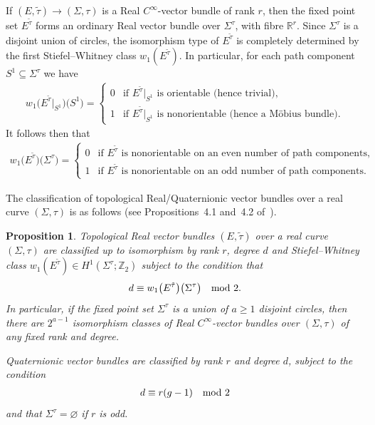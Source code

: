 \documentclass[10pt,a4paper]{amsart}
\numberwithin{equation}{section}
\newtheorem{Proposition}[Theorem]{Proposition}
\begin{document}
If $(E,\tilde{\tau})\rightarrow (\Sigma, \tau)$ is a Real $C^{\infty}$-vector bundle of rank $r$, then the f\/ixed point set $E^{\tilde{\tau}}$ forms an ordinary Real vector bundle over $\Sigma^{\tau}$, with f\/ibre ${\mathbb R}^r$. Since $\Sigma^{\tau}$ is a disjoint union of circles, the isomorphism type of $E^{\tilde{\tau}}$ is completely determined by the f\/irst Stiefel--Whitney class $w_1(E^{\tilde{\tau}})$. In particular, for each path component $S^1 \subseteq \Sigma^{\tau}$ we have
\begin{gather*} w_1\big(E^{\tilde{\tau}}|_{S^1}\big)\big(S^1\big) = \begin{cases} 0 & \text{if $E^{\tilde{\tau}}|_{S^1}$ is orientable (hence trivial)}, \\
1 & \text{if $E^{\tilde{\tau}}|_{S^1}$ is nonorientable (hence a M\"obius bundle)}. \end{cases} \end{gather*}
It follows then that
\begin{gather*} w_1\big(E^{\tilde{\tau}}\big)\big(\Sigma^{\tau}\big) = \begin{cases} 0 & \text{if $E^{\tilde{\tau}}$ is nonorientable on an even number of path components}, \\ 1 & \text{if $E^{\tilde{\tau}}$ is nonorientable on an odd number of path components}. \end{cases} \end{gather*}

The classif\/ication of topological Real/Quaternionic vector bundles over a real curve $(\Sigma, \tau)$ is as follows (see Propositions~4.1 and~4.2 of~\cite{BHH}).

\begin{Proposition}\label{arecbu}
Topological Real vector bundles $(E,\tilde{\tau})$ over a real curve $(\Sigma, \tau)$ are classified up to isomorphism by rank $r$, degree $d$ and Stiefel--Whitney class $w_1(E^{\tilde{\tau}}) \in H^1(\Sigma^{\tau};{\mathbb Z}_2)$ subject to the condition that \begin{gather*}d \equiv w_1\big(E^{\tilde{\tau}}\big)\big(\Sigma^{\tau}\big) \quad {\rm mod}~2. \end{gather*}
In particular, if the fixed point set $\Sigma^{\tau}$ is a union of $a\geq 1$ disjoint circles, then there are $2^{a-1}$ isomorphism classes of Real $C^{\infty}$-vector bundles over $(\Sigma,\tau)$ of any fixed rank and degree.

Quaternionic vector bundles are classified by rank $r$ and degree $d$, subject to the condition
\begin{gather*}%
d \equiv r(g-1) \quad {\rm mod}~2
\end{gather*}
and that $\Sigma^{\tau} = \varnothing$ if $r$ is odd.
\end{Proposition}
\end{document}
